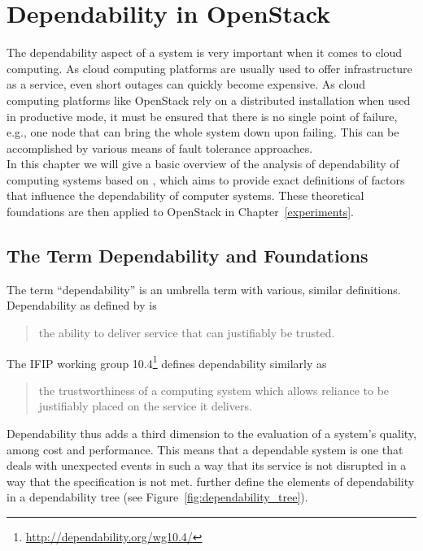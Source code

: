 \section[Dependability in OpenStack \texorpdfstring{{\textbf{\tiny \enspace (JE, NK)}}}{}]{Dependability in OpenStack}
\label{dependability}
The dependability aspect of a system is very important when it comes to cloud computing. As cloud computing platforms are usually used to offer infrastructure as a service, even short outages can quickly become expensive. As cloud computing platforms like OpenStack rely on a distributed installation when used in productive mode, it must be ensured that there is no single point of failure, e.g., one node that can bring the whole system down upon failing. This can be accomplished by various means of fault tolerance approaches.\\

In this chapter we will give a basic overview of the analysis of dependability of computing systems based on \cite{Laprie:1992:DBC:573776}, which aims to provide exact definitions of factors that influence the dependability of computer systems. These theoretical foundations are then applied to OpenStack in Chapter~\ref{experiments}.

\subsection{The Term Dependability and Foundations}
The term ``dependability'' is an umbrella term with various, similar definitions. Dependability as defined by \cite{laprie} is 
\begin{quote}
the ability to deliver service that can justifiably be trusted.
\end{quote}
The IFIP working group 10.4\footnote{\url{http://dependability.org/wg10.4/}} defines dependability similarly as
\begin{quote}
the trustworthiness of a computing system which allows reliance to be justifiably placed on the service it delivers.
\end{quote}
Dependability thus adds a third dimension to the evaluation of a system's quality, among cost and performance. This means that a dependable system is one that deals with unexpected events in such a way that its service is not disrupted in a way that the specification is not met. \cite{laprie} further define the elements of dependability in a dependability tree (see Figure~\ref{fig:dependability_tree}).\\

